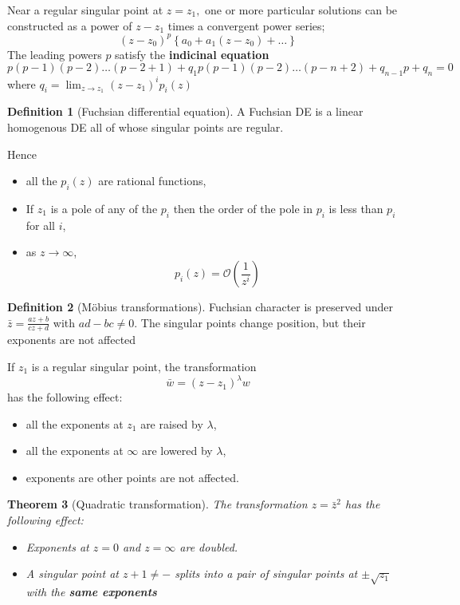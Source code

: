 \documentclass[10pt, oneside, reqno]{amsart}
\theoremstyle{plain}%
\newtheorem{thm}{Theorem}[section]
\theoremstyle{definition}
\newtheorem{defn}[thm]{Definition}
\theoremstyle{remark}
\newcommand{\bigo}[1]{\mathcal{O}(#1)}
\begin{document}
Near a regular singular point at $z = z_1,$ one or more particular solutions can be constructed as a power of $z - z_1$ times a convergent power series;
\[
    (z - z_0)^p \left\{ a_0 + a_1 (z - z_0) + \dots \right\}
\]
The leading powers $p$ satisfy the \textbf{indicinal equation} \[
    p(p-1)(p-2)\dots(p-2+1) + q_1 p(p-1)(p-2)\dots(p-n+2) + q_{n-1}p + q_n = 0
\] where $q_i = \lim_{z \rightarrow z_1}(z - z_1)^i p_i (z)$

\begin{defn}[Fuchsian differential equation]
    A Fuchsian DE is a linear homogenous DE  all of whose singular points are regular. 
\end{defn}

Hence \begin{itemize}
    \item all the $p_i(z)$ are rational functions,
    \item If $z_1$ is a pole of any of the $p_i$ then the order of the pole in $p_i$ is less than $p_i$ for all $i$,
    \item as $z \rightarrow \infty$, \[
        p_i(z) = \bigo{\frac{1}{z^i}}
    \]
\end{itemize}

\begin{defn}[M\"obius transformations]
    Fuchsian character is preserved under $\bar z = \frac{az + b}{cz + d}$ with $ad - bc \neq 0$.  The singular points change position, but their exponents are not affected
\end{defn}

If $z_1$ is a regular singular point, the transformation \[
    \bar w = (z - z_1)^\lambda w
\] has the following effect: 
\begin{itemize}
    \item all the exponents at $z_1$ are raised by $\lambda$,
    \item all the exponents at $\infty$ are lowered by $\lambda$,
    \item exponents are other points are not affected.
\end{itemize}

\begin{thm}[Quadratic transformation]
    The transformation $z = \bar z ^2$ has the following effect:
    \begin{itemize}
        \item Exponents at $z = 0$ and $z = \infty$ are doubled.
        \item A singular point at $z+1 \neq -$ splits into a pair of singular points at $\pm \sqrt{z_1}$ with the \textbf{same exponents}
    \end{itemize}
\end{thm}
\end{document}
